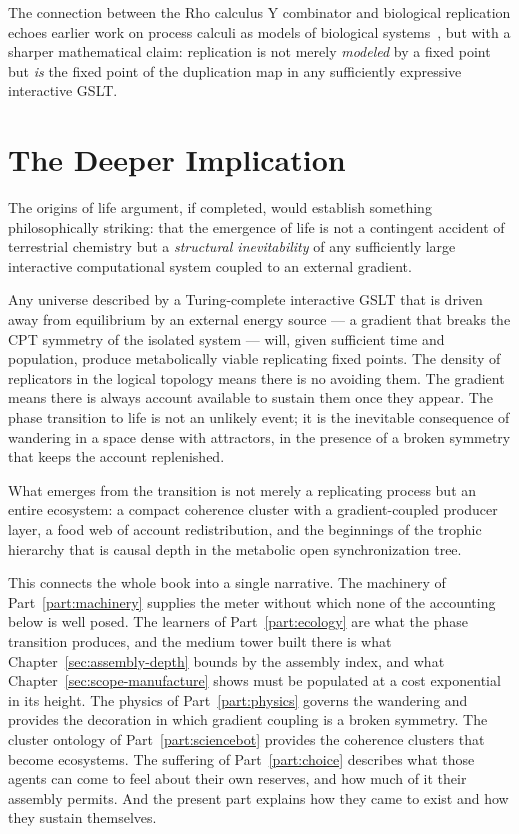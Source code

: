 The connection between the Rho calculus Y combinator and
biological replication echoes earlier work on process calculi
as models of biological systems~\cite{regev2001representation},
but with a sharper mathematical claim: replication is not merely
\emph{modeled} by a fixed point but \emph{is} the fixed point
of the duplication map in any sufficiently expressive interactive
GSLT.

\section{The Deeper Implication}

The origins of life argument, if completed, would establish
something philosophically striking: that the emergence of life
is not a contingent accident of terrestrial chemistry but a
\emph{structural inevitability} of any sufficiently large
interactive computational system coupled to an external gradient.

Any universe described by a Turing-complete interactive GSLT
that is driven away from equilibrium by an external energy source
--- a gradient that breaks the CPT symmetry of the isolated
system --- will, given sufficient time and population, produce
metabolically viable replicating fixed points.
The density of replicators in the logical topology means there is
no avoiding them.
The gradient means there is always account available to sustain
them once they appear.
The phase transition to life is not an unlikely event; it is
the inevitable consequence of wandering in a space dense with
attractors, in the presence of a broken symmetry that keeps
the account replenished.

What emerges from the transition is not merely a replicating
process but an entire ecosystem: a compact coherence cluster
with a gradient-coupled producer layer, a food web of account
redistribution, and the beginnings of the trophic hierarchy
that is causal depth in the metabolic open synchronization tree.

This connects the whole book into a single narrative.
The machinery of Part~\ref{part:machinery} supplies the meter without
which none of the accounting below is well posed.
The learners of Part~\ref{part:ecology} are what the phase transition
produces, and the medium tower built there is what
Chapter~\ref{sec:assembly-depth} bounds by the assembly index, and what
Chapter~\ref{sec:scope-manufacture} shows must be populated at a cost
exponential in its height.
The physics of Part~\ref{part:physics} governs the wandering and
provides the decoration in which gradient coupling is a broken symmetry.
The cluster ontology of Part~\ref{part:sciencebot} provides the
coherence clusters that become ecosystems.
The suffering of Part~\ref{part:choice} describes what those agents can
come to feel about their own reserves, and how much of it their assembly
permits.
And the present part explains how they came to exist and how they sustain
themselves.

